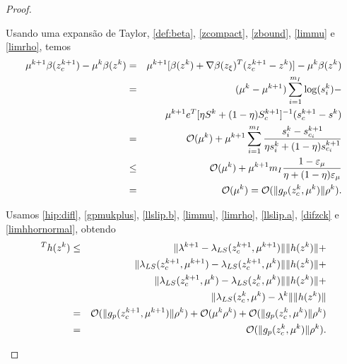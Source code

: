 \begin{proof}
\begin{description}
Usando uma expansão de Taylor,
\eqref{def:beta},
\eqref{zcompact}, \eqref{zbound}, \eqref{limmu} e \eqref{limrho}, temos
\begin{eqnarray}
  \mu^{k+1}\beta(\zc{k+1}) - \mu^k\beta(z^k) 
  & = & \mu^{k+1}[\beta(z^k) + \nabla \beta(z_{\xi})^T(\zc{k+1}-z^k)] 
    - \mu^k\beta(z^k) \nonumber \\
  & = & (\mu^{k}-\mu^{k+1})\sum_{i=1}^{m_I}\log(s_i^k) - \nonumber \\
  & & \mu^{k+1} e^T [\eta S^k + (1-\eta) S_c^{k+1}]^{-1}(s_c^{k+1}-s^k) \nonumber \\
  & = & \bigo(\mu^k) + \mu^{k+1}\sum_{i=1}^{m_I} \frac{s_i^k - s_{c_i}^{k+1}}
    {\eta s_i^k + (1-\eta)s_{c_i}^{k+1}} \nonumber \\
  & \leq & \bigo(\mu^k) + \mu^{k+1}m_I\frac{1-\epsmu}{\eta + (1-\eta)\epsmu}
    \nonumber \\
    & = & \bigo(\mu^k) = \bigo(\norma{g_p(\zc{k},\mu^k)}\rho^k).
    \visiblelbl{termo2.dlvaux4}
\end{eqnarray}

Usamos \eqref{hip:difl}, \eqref{gpmukplus},
\eqref{llslip.b}, \eqref{limmu}, \eqref{limrho},
\eqref{llslip.a},
\eqref{difzck} e \eqref{limhhornormal},
obtendo 
\begin{eqnarray}
  [\lk{k+1} - \lk{k}]^Th(z^k) & \leq & 
  \norma{\lk{k+1} - \lls(\zc{k+1},\mu^{k+1})}\norma{h(z^k)} + \nonumber \\
  & & \norma{\lls(\zc{k+1},\mu^{k+1}) - \lls(\zc{k+1},\mu^k)}\norma{h(z^k)} +
    \nonumber \\
  & & \norma{\lls(\zc{k+1},\mu^k) - \lls(\zc{k},\mu^k)}\norma{h(z^k)} + \nonumber \\
  & & \norma{\lls(\zc{k},\mu^k) - \lk{k}} \norma{h(z^k)} \nonumber \\
  & = & \bigo(\norma{g_p(\zc{k+1},\mu^{k+1})}\rho^k) +
    \bigo(\mu^k\rho^k) + 
    \bigo(\norma{g_p(\zc{k},\mu^k)}\rho^k) \nonumber \\
    & = & \bigo(\norma{g_p(\zc{k},\mu^k)}\rho^k). \visiblelbl{termo3.dlvaux4}
\end{eqnarray}


\end{description}
\end{proof}
